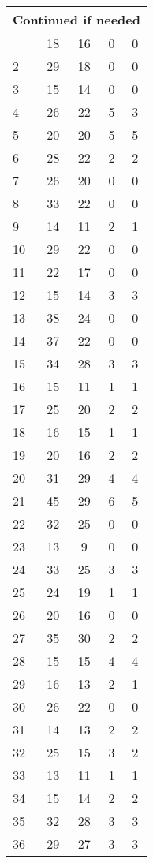 \begin{center}
\begin{longtable}{l|c|c|c|c}
\hline \multicolumn{5}{|r|}{{Continued if needed}} \\ \hline
\endfoot 
1 & 18 & 16 & 0 & 0\\ \hline
2 & 29 & 18 & 0 & 0\\ \hline
3 & 15 & 14 & 0 & 0\\ \hline
4 & 26 & 22 & 5 & 3\\ \hline
5 & 20 & 20 & 5 & 5\\ \hline
6 & 28 & 22 & 2 & 2\\ \hline
7 & 26 & 20 & 0 & 0\\ \hline
8 & 33 & 22 & 0 & 0\\ \hline
9 & 14 & 11 & 2 & 1\\ \hline
10 & 29 & 22 & 0 & 0\\ \hline
11 & 22 & 17 & 0 & 0\\ \hline
12 & 15 & 14 & 3 & 3\\ \hline
13 & 38 & 24 & 0 & 0\\ \hline
14 & 37 & 22 & 0 & 0\\ \hline
15 & 34 & 28 & 3 & 3\\ \hline
16 & 15 & 11 & 1 & 1\\ \hline
17 & 25 & 20 & 2 & 2\\ \hline
18 & 16 & 15 & 1 & 1\\ \hline
19 & 20 & 16 & 2 & 2\\ \hline
20 & 31 & 29 & 4 & 4\\ \hline
21 & 45 & 29 & 6 & 5\\ \hline
22 & 32 & 25 & 0 & 0\\ \hline
23 & 13 & 9 & 0 & 0\\ \hline
24 & 33 & 25 & 3 & 3\\ \hline
25 & 24 & 19 & 1 & 1\\ \hline
26 & 20 & 16 & 0 & 0\\ \hline
27 & 35 & 30 & 2 & 2\\ \hline
28 & 15 & 15 & 4 & 4\\ \hline
29 & 16 & 13 & 2 & 1\\ \hline
30 & 26 & 22 & 0 & 0\\ \hline
31 & 14 & 13 & 2 & 2\\ \hline
32 & 25 & 15 & 3 & 2\\ \hline
33 & 13 & 11 & 1 & 1\\ \hline
34 & 15 & 14 & 2 & 2\\ \hline
35 & 32 & 28 & 3 & 3\\ \hline
36 & 29 & 27 & 3 & 3\\ \hline

\end{longtable}
\end{center}
